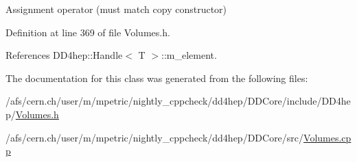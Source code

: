 Assignment operator (must match copy constructor) 



Definition at line 369 of file Volumes.\+h.



References D\+D4hep\+::\+Handle$<$ T $>$\+::m\+\_\+element.



The documentation for this class was generated from the following files\+:\begin{DoxyCompactItemize}
\item 
/afs/cern.\+ch/user/m/mpetric/nightly\+\_\+cppcheck/dd4hep/\+D\+D\+Core/include/\+D\+D4hep/\hyperlink{_volumes_8h}{Volumes.\+h}\item 
/afs/cern.\+ch/user/m/mpetric/nightly\+\_\+cppcheck/dd4hep/\+D\+D\+Core/src/\hyperlink{_volumes_8cpp}{Volumes.\+cpp}\end{DoxyCompactItemize}
